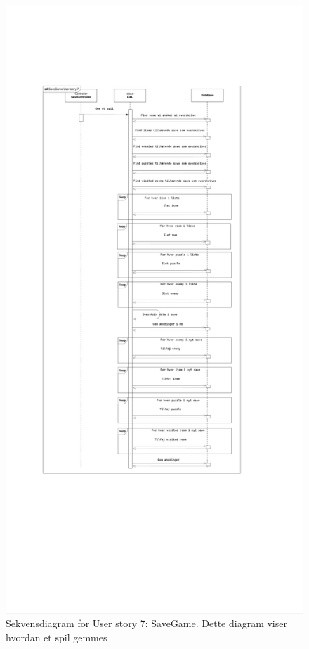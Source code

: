 \begin{figure}[H]
\centering
\includegraphics[width = \textwidth]{02-Body/Images/SaveGameDB.pdf}
\caption{Sekvensdiagram for User story 7: SaveGame. Dette diagram viser hvordan et spil gemmes}
\label{fig:SaveGameDB}
\end{figure}

